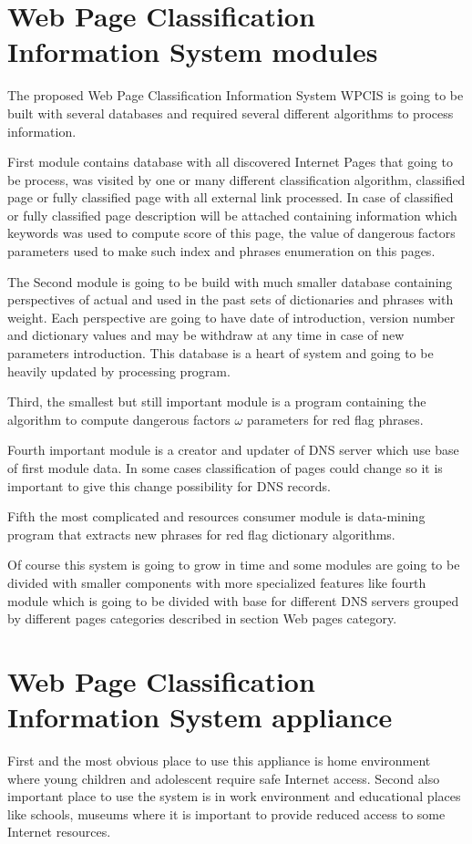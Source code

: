 \documentclass[9pt,a4paper]{extarticle}
\begin{document}
\begin{multicols}{2}
\section{Web Page Classification Information System modules}
The proposed Web Page Classification Information System WPCIS is going to be built  with several databases and required  several different algorithms to process information.

First module contains database with all discovered Internet Pages that going to be process, was visited by one or many different classification algorithm, classified page or fully classified page with all external link processed. In case of classified or fully classified page description will be attached containing information which keywords was used to compute score of this page, the value of dangerous factors parameters used to make such index and phrases enumeration on this pages.

The Second module is going to be build with much smaller database containing perspectives of actual and used in the past sets of dictionaries and phrases with weight. Each perspective are going to have date of introduction, version number and dictionary values and may be withdraw at any time in case of new parameters introduction. This database is a heart of system and going to be heavily updated by processing program.

Third, the smallest but still important module is a program containing the algorithm to compute dangerous factors \(\omega\) parameters for red flag phrases.

Fourth important module is a creator and updater of DNS server which use base of first module data. In some cases classification of pages could change so it is important to give this change possibility for DNS records.

Fifth the most complicated and resources consumer module is data-mining program that extracts new phrases for red flag dictionary algorithms.

Of course this system is going to grow in time and some modules are going to be divided with smaller components with more specialized features like fourth module which is  going to be divided with base for different DNS servers grouped by different pages categories described in section Web pages category.

\section{Web Page Classification Information System appliance}
First and the most obvious place to use this appliance is home environment where young children and adolescent require safe Internet access. Second also important place to use the system is in work environment and educational places like schools, museums where it is important to provide reduced access to some Internet resources.


\end{multicols}
\end{document}
